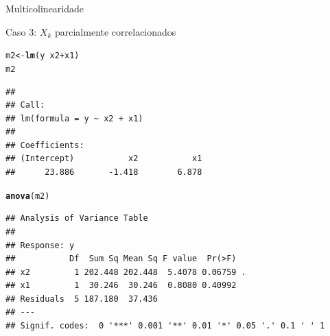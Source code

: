\documentclass{beamer}\usepackage[]{graphicx}\usepackage[]{color}
\makeatletter
\newcommand{\hlopt}[1]{\textcolor[rgb]{0,0,0}{#1}}%
\newcommand{\hlstd}[1]{\textcolor[rgb]{0.345,0.345,0.345}{#1}}%
\newcommand{\hlkwb}[1]{\textcolor[rgb]{0.69,0.353,0.396}{#1}}%
\newcommand{\hlkwd}[1]{\textcolor[rgb]{0.737,0.353,0.396}{\textbf{#1}}}%
\newenvironment{kframe}{%
 \def\at@end@of@kframe{}%
 \ifinner\ifhmode%
  \def\at@end@of@kframe{\end{minipage}}%
  \begin{minipage}{\columnwidth}%
 \fi\fi%
 \def\FrameCommand##1{\hskip\@totalleftmargin \hskip-\fboxsep
 \colorbox{shadecolor}{##1}\hskip-\fboxsep
     \hskip-\linewidth \hskip-\@totalleftmargin \hskip\columnwidth}%
 \MakeFramed {\advance\hsize-\width
   \@totalleftmargin\z@ \linewidth\hsize
   \@setminipage}}%
 {\par\unskip\endMakeFramed%
 \at@end@of@kframe}
\newenvironment{knitrout}{}{} %
\renewenvironment{knitrout}{\setlength{\topsep}{0mm}}{}
\makeatother
\begin{document}
\begin{frame}[fragile]{Multicolinearidade}

Caso 3: $X_k$ parcialmente correlacionados
\vfill

\begin{knitrout}\tiny
{}\color{fgcolor}\begin{kframe}
\begin{alltt}
\hlstd{m2} \hlkwb{<-} \hlkwd{lm}\hlstd{(y} \hlopt{~} \hlstd{x2} \hlopt{+} \hlstd{x1)}
\hlstd{m2}
\end{alltt}
\begin{verbatim}
## 
## Call:
## lm(formula = y ~ x2 + x1)
## 
## Coefficients:
## (Intercept)           x2           x1  
##      23.886       -1.418        6.878
\end{verbatim}
\begin{alltt}
\hlkwd{anova}\hlstd{(m2)}
\end{alltt}
\begin{verbatim}
## Analysis of Variance Table
## 
## Response: y
##           Df  Sum Sq Mean Sq F value  Pr(>F)  
## x2         1 202.448 202.448  5.4078 0.06759 .
## x1         1  30.246  30.246  0.8080 0.40992  
## Residuals  5 187.180  37.436                  
## ---
## Signif. codes:  0 '***' 0.001 '**' 0.01 '*' 0.05 '.' 0.1 ' ' 1
\end{verbatim}
\end{kframe}
\end{knitrout}

\end{frame}
\end{document}
